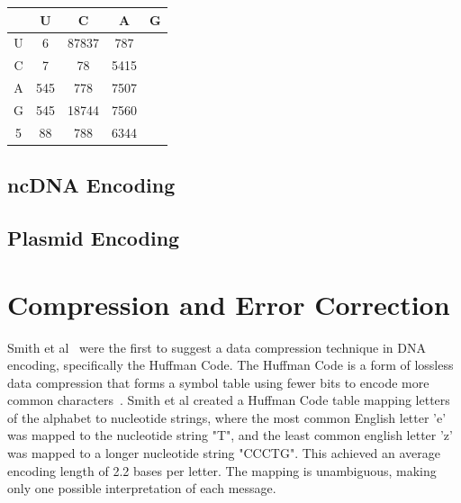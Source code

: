 \documentclass[USenglish,oneside,twocolumn]{article}
\begin{document}
\begin{center}
 \begin{tabular}{||c || c c c c||}
 \hline
  & U & C & A & G \\ [0.5ex]
 \hline\hline
 U & 6 & 87837 & 787 \\
 \hline
 C & 7 & 78 & 5415 \\
 \hline
 A & 545 & 778 & 7507 \\
 \hline
 G & 545 & 18744 & 7560 \\
 \hline
 5 & 88 & 788 & 6344 \\ [1ex]
 \hline
\end{tabular}
\end{center}

\subsection{ncDNA Encoding}

\subsection{Plasmid Encoding}

\section{Compression and Error Correction}

Smith et al~\cite{SFHC2003BL} were the first to suggest a data compression technique in DNA encoding, specifically the Huffman Code. The Huffman Code is a form of lossless data compression that forms a symbol table using fewer bits to encode more common characters~\cite{H1952POTIRE}. Smith et al created a Huffman Code table mapping letters of the alphabet to nucleotide strings, where the most common English letter 'e' was mapped to the nucleotide string "T", and the least common english letter 'z' was mapped to a longer nucleotide string "CCCTG". This achieved an average encoding length of 2.2 bases per letter. The mapping is unambiguous, making only one possible interpretation of each message.
\end{document}
